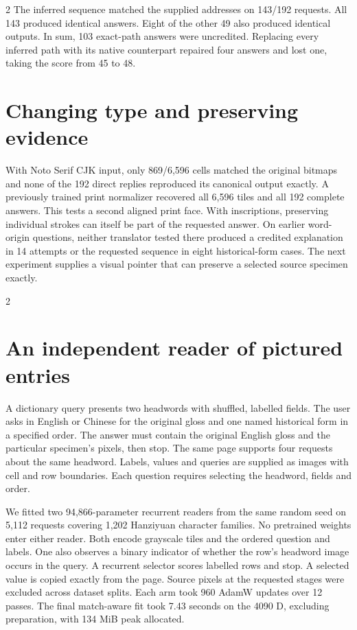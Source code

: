 \documentclass[10pt,a4paper]{article}
\newcommand{\pageheading}[1]{\noindent{\sffamily\bfseries\fontsize{17}{20}\selectfont #1\par}\vspace{4pt}}
\begin{document}
\begin{multicols}{2}
The inferred sequence matched the supplied addresses on 143/192 requests. All 143 produced identical answers. Eight of the other 49 also produced identical outputs. In sum, 103 exact-path answers were uncredited. Replacing every inferred path with its native counterpart repaired four answers and lost one, taking the score from 45 to 48.

\section*{Changing type and preserving evidence}
With Noto Serif CJK input, only 869/6,596 cells matched the original bitmaps and none of the 192 direct replies reproduced its canonical output exactly. A previously trained print normalizer recovered all 6,596 tiles and all 192 complete answers. This tests a second aligned print face. With inscriptions, preserving individual strokes can itself be part of the requested answer. On earlier word-origin questions, neither translator tested there produced a credited explanation in 14 attempts or the requested sequence in eight historical-form cases. The next experiment supplies a visual pointer that can preserve a selected source specimen exactly.
\end{multicols}
\newpage
\pageheading{Reading a meaning and its historical form}
\begin{multicols}{2}
\section*{An independent reader of pictured entries}
A dictionary query presents two headwords with shuffled, labelled fields. The user asks in English or Chinese for the original gloss and one named historical form in a specified order. The answer must contain the original English gloss and the particular specimen's pixels, then stop. The same page supports four requests about the same headword. Labels, values and queries are supplied as images with cell and row boundaries. Each question requires selecting the headword, fields and order.

We fitted two 94,866-parameter recurrent readers from the same random seed on 5,112 requests covering 1,202 Hanziyuan character families. No pretrained weights enter either reader. Both encode grayscale tiles and the ordered question and labels. One also observes a binary indicator of whether the row's headword image occurs in the query. A recurrent selector scores labelled rows and stop. A selected value is copied exactly from the page. Source pixels at the requested stages were excluded across dataset splits. Each arm took 960 AdamW updates over 12 passes. The final match-aware fit took 7.43 seconds on the 4090 D, excluding preparation, with 134 MiB peak allocated.
\end{multicols}
\end{document}
